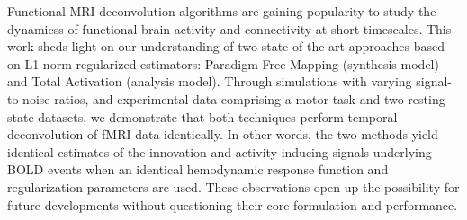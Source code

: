 Functional MRI deconvolution algorithms are gaining popularity to study the dynamicss of functional brain activity and connectivity at short timescales. This work sheds light on our understanding of two state-of-the-art approaches based on L1-norm regularized estimators: Paradigm Free Mapping (synthesis model) and Total Activation (analysis model). Through simulations with varying signal-to-noise ratios, and experimental data comprising a motor task and two resting-state datasets, we demonstrate that both techniques perform temporal deconvolution of fMRI data identically. In other words, the two methods yield identical estimates of the innovation and activity-inducing signals underlying BOLD events when an identical hemodynamic response function and regularization parameters are used. These observations open up the possibility for future developments without questioning their core formulation and performance.